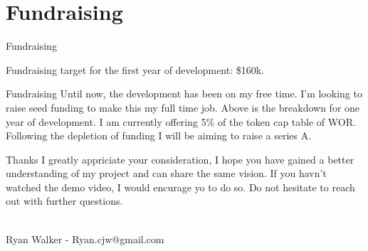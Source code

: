 \documentclass[final, ngerman, xcolor=pdftex, dvipsnames, table, aspectratio=169, 14pt]{beamer}
\begin{document}
\section{Fundraising}

\begin{frame}{Fundraising}
\begin{center}

Fundraising target for the first year of development: \$160k.
\end{center}

\end{frame}
\begin{frame}{Fundraising}
Until now, the development has been on my free time. I'm looking to raise seed funding to make this my full time job. Above is the breakdown for one year of development. I am currently offering 5\% of the token cap table of WOR. Following the depletion of funding I will be aiming to raise a series A.
\end{frame}

\begin{frame}{Thanks}
I greatly appriciate your consideration, I hope you have gained a better understanding of my project and can share the same vision. If you havn't watched the demo video, I would encurage yo to do so. Do not hesitate to reach out with further questions.
\\~\\
\begin{center}
Ryan Walker - Ryan.cjw@gmail.com
\end{center}
\end{frame}
\end{document}
